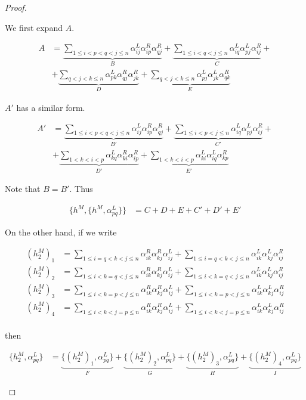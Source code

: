 \documentclass[a4paper,final, reqno]{amsart}
\theoremstyle{plain}
\theoremstyle{definition}
\begin{document}
\begin{proof}
\begin{itemize}
			We first expand $A$.
			
			\begin{align*}
				A &= \underbrace{\sum_{1\leq i<p<q<j\leq n} \alpha_{ij}^L\alpha_{ip}^R\alpha_{qj}^R}_{B} + \underbrace{\sum_{1\leq i<q<j\leq n} \alpha_{iq}^L\alpha_{pj}^L\alpha_{ij}^R}_{C} +\\
				&+ \underbrace{\sum_{q<j<k\leq n} \alpha_{pk}^L\alpha_{qj}^R\alpha_{jk}^R}_{D} + \underbrace{\sum_{q<j<k\leq n} \alpha_{pj}^L\alpha_{jk}^L\alpha_{qk}^R}_{E}
			\end{align*}
			
			$A'$ has a similar form.
			
			\begin{align*}
				A' &= \underbrace{\sum_{1\leq i<p<q<j\leq n} \alpha_{ij}^L\alpha_{ip}^R\alpha_{qj}^R}_{B'} + \underbrace{\sum_{1\leq i<p<j\leq n} \alpha_{iq}^L\alpha_{pj}^L\alpha_{ij}^R}_{C'} +\\
				&+ \underbrace{\sum_{1<k<i<p} \alpha_{kq}^L\alpha_{ki}^R\alpha_{ip}^R}_{D'} + \underbrace{\sum_{1<k<i<p} \alpha_{ki}^L\alpha_{iq}^L\alpha_{kp}^R}_{E'}
			\end{align*}
			
			Note that $B=B'$. Thus 
			
			\begin{align*}
				\{h^M, \{h^M, \alpha_{pq}^L \}\} &= C+D+E+C'+D'+E'
			\end{align*}
			
			
			On the other hand, if we write 
			
			\begin{align*}
				(h_2^M)_1 &= \sum_{1\leq i=q<k<j\leq n} \alpha_{ik}^R\alpha_{kj}^R\alpha_{ij}^L + \sum_{1\leq i=q<k<j\leq n} \alpha_{ik}^L\alpha_{kj}^L\alpha_{ij}^R \\
				(h_2^M)_2 &= \sum_{1\leq i<k=q<j\leq n} \alpha_{ik}^R\alpha_{kj}^R\alpha_{ij}^L + \sum_{1\leq i<k=q<j\leq n} \alpha_{ik}^L\alpha_{kj}^L\alpha_{ij}^R \\
				(h_2^M)_3 &= \sum_{1\leq i<k=p<j\leq n} \alpha_{ik}^R\alpha_{kj}^R\alpha_{ij}^L + \sum_{1\leq i<k=p<j\leq n} \alpha_{ik}^L\alpha_{kj}^L\alpha_{ij}^R \\
				(h_2^M)_4 &= \sum_{1\leq i<k<j=p\leq n} \alpha_{ik}^R\alpha_{kj}^R\alpha_{ij}^L + \sum_{1\leq i<k<j=p\leq n} \alpha_{ik}^L\alpha_{kj}^L\alpha_{ij}^R \\
			\end{align*}
			
			then 
			
			\begin{align*}
				\{h_2^M , \alpha_{pq}^L\} &= \underbrace{\{(h_2^M)_1 , \alpha_{pq}^L\}}_F + \underbrace{\{(h_2^M)_2 , \alpha_{pq}^L\}}_G + \underbrace{\{(h_2^M)_3 , \alpha_{pq}^L\}}_H + \underbrace{\{(h_2^M)_4 , \alpha_{pq}^L\}}_I
			\end{align*}
			

\end{itemize}
\end{proof}
\end{document}
